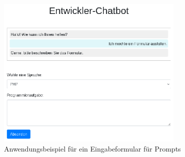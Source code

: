 \begin{figure}[!ht]
	\includegraphics[width=0.8\textwidth]{content/chapter_discussion/images/chatbot_form_example.eps}
	\centering
	\caption{Anwendungsbeispiel für ein Eingabeformular für Prompts}
	\label{img:example_chat_form}
\end{figure}




